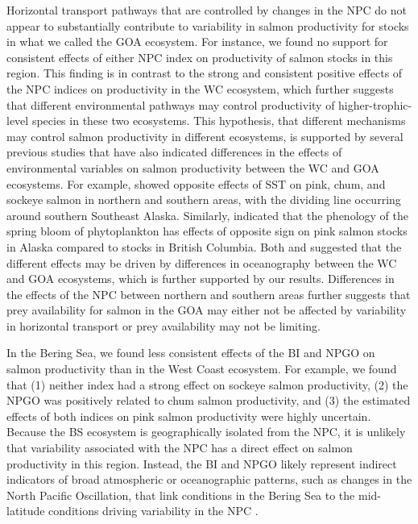 Horizontal transport pathways that are controlled by changes in the NPC do not
appear to substantially contribute to variability in salmon productivity for
stocks in what we called the GOA ecosystem. For instance, we found no support
for consistent effects of either NPC index on productivity of salmon stocks in
this region. This finding is in contrast to the strong and consistent positive
effects of the NPC indices on productivity in the WC ecosystem, which further
suggests that different environmental pathways may control productivity of
higher-trophic-level species in these two ecosystems. This hypothesis, that
different mechanisms may control salmon productivity in different ecosystems, is
supported by several previous studies that have also indicated differences in
the effects of environmental variables on salmon productivity between the WC and
GOA ecosystems. For example, \citet{Mueter2002a} showed opposite effects of SST
on pink, chum, and sockeye salmon in northern and southern areas, with the
dividing line occurring around southern Southeast Alaska. Similarly,
\citet{Malick2015a} indicated that the phenology of the spring bloom of
phytoplankton has effects of opposite sign on pink salmon stocks in Alaska
compared to stocks in British Columbia. Both \citet{Mueter2002a} and
\citet{Malick2015a} suggested that the different effects may be driven by
differences in oceanography between the WC and GOA ecosystems, which is further
supported by our results. Differences in the effects of the NPC between northern
and southern areas further suggests that prey availability for salmon in the GOA
may either not be affected by variability in horizontal transport or prey
availability may not be limiting.

In the Bering Sea, we found less consistent effects of the BI and NPGO on salmon
productivity than in the West Coast ecosystem. For example, we found that (1)
neither index had a strong effect on sockeye salmon productivity, (2) the NPGO
was positively related to chum salmon productivity, and (3) the estimated
effects of both indices on pink salmon productivity were highly uncertain.
Because the BS ecosystem is geographically isolated from the NPC, it is unlikely
that variability associated with the NPC has a direct effect on salmon
productivity in this region. Instead, the BI and NPGO likely represent indirect
indicators of broad atmospheric or oceanographic patterns, such as changes in
the North Pacific Oscillation, that link conditions in the Bering Sea to the
mid-latitude conditions driving variability in the NPC \citep{DiLorenzo2013a}.

